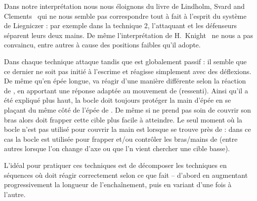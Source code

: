 Dans notre interprétation nous nous éloignons du livre de Lindholm, Svard and Clements~\cite{lindholm:ringeck_others:2006} qui ne nous semble pas correspondre tout à fait à l'esprit du système de Liegniczer : par exemple dans la technique 2, l'attaquant et les défenseurs séparent leurs deux mains.
De même l'interprétation de H.\ Knight~\cite[part I]{knight:epee_bocle} ne nous a pas convaincu, entre autres à cause des positions faibles qu'il adopte.

Dans chaque technique \A attaque tandis que \D est globalement passif : il semble que ce dernier ne soit pas initié à l'escrime et réagisse simplement avec des déflexions.
De même qu'en épée longue, \A va réagir d'une manière différente selon la réaction de \D, en apportant une réponse adaptée au mouvement de \D (ressenti).
Ainsi qu'il a été expliqué plus haut, la bocle doit toujours protéger la main d'épée en se plaçant du même côté de l'épée de \D.
De même si \D ne prend pas soin de couvrir son bras alors \A doit frapper cette cible plus facile à atteindre.
Le seul moment où la bocle n'est pas utilisé pour couvrir la main est lorsque \A se trouve près de \D : dans ce cas la bocle est utilisée pour frapper et/ou contrôler les bras/mains de \D (entre autres lorsque l'on change d'axe ou que l'n vient chercher une cible basse).

L'idéal pour pratiquer ces techniques est de décomposer les techniques en séquences où \A doit réagir correctement selon ce que fait \D – d'abord en augmentant progressivement la longueur de l'enchaînement, puis en variant d'une fois à l'autre.


